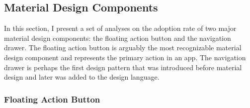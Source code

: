 \subsection{Material Design Components}
In this section, I present a set of analyses on the adoption rate of two major material design components: the floating action button and the navigation drawer.
The floating action button is arguably the most recognizable material design component and  represents the primary action in an app.
The navigation drawer is perhaps the first design pattern that was introduced before material design and later was added to the design language.

\subsubsection{Floating Action Button}
